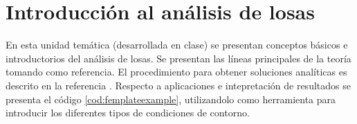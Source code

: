 %
%
%

\chapter{Introducción al análisis de losas}


En esta unidad temática (desarrollada en clase) se presentan conceptos básicos e introductorios del análisis de losas. Se presentan las líneas principales de la teoría tomando \cite{Onate2013} como referencia. 
%
El procedimiento para obtener soluciones analíticas es descrito en la referencia \citep{Reddy2002b}.
%
Respecto a aplicaciones e intepretación de resultados se presenta el código \ref{cod:femplateexample}, utilizandolo como herramienta para introducir los diferentes tipos de condiciones de contorno.